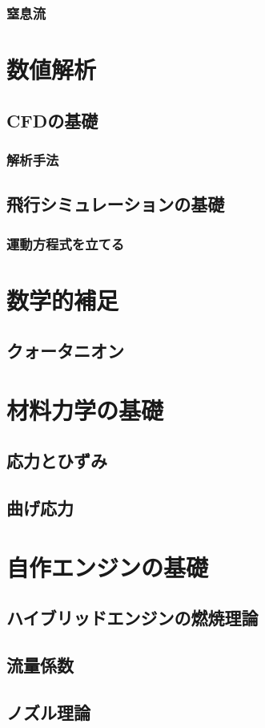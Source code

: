 \documentclass[uplatex,dvipdfmx,a4j,11pt]{jsreport}
\numberwithin{equation}{chapter}
\begin{document}
\subsection{窒息流}


\chapter{数値解析}

\section{CFDの基礎}
\subsection{解析手法}

\section{飛行シミュレーションの基礎}
\subsection{運動方程式を立てる}


\appendix

\chapter{数学的補足}
\section{クォータニオン}

\chapter{材料力学の基礎}
\section{応力とひずみ}

\section{曲げ応力}

\chapter{自作エンジンの基礎}
\section{ハイブリッドエンジンの燃焼理論}
\section{流量係数}
\section{ノズル理論}




\end{document}
